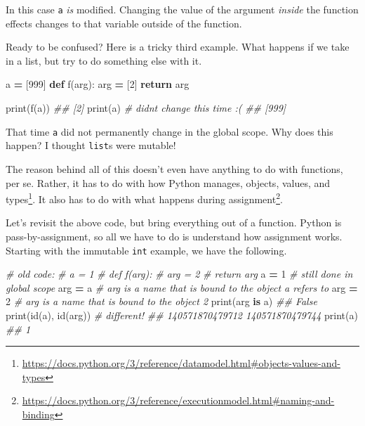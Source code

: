 \documentclass[
  12pt,
  krantz2]{krantz}
\makeatletter
\newenvironment{Shaded}{\begin{snugshade}}{\end{snugshade}}
\newcommand{\BuiltInTok}[1]{#1}
\newcommand{\CommentTok}[1]{\textcolor[rgb]{0.37,0.37,0.37}{\textit{#1}}}
\newcommand{\ControlFlowTok}[1]{\textcolor[rgb]{0.27,0.27,0.27}{\textbf{#1}}}
\newcommand{\DecValTok}[1]{\textcolor[rgb]{0.06,0.06,0.06}{#1}}
\newcommand{\KeywordTok}[1]{\textcolor[rgb]{0.27,0.27,0.27}{\textbf{#1}}}
\newcommand{\NormalTok}[1]{#1}
\newcommand{\OperatorTok}[1]{\textcolor[rgb]{0.43,0.43,0.43}{\textbf{#1}}}
\renewcommand{\href}[2]{#2\footnote{\url{#1}}}
\newenvironment{kframe}{%
\medskip{}
\setlength{\fboxsep}{.8em}
 \def\at@end@of@kframe{}%
 \ifinner\ifhmode%
  \def\at@end@of@kframe{\end{minipage}}%
  \begin{minipage}{\columnwidth}%
 \fi\fi%
 \def\FrameCommand##1{\hskip\@totalleftmargin \hskip-\fboxsep
 \colorbox{shadecolor}{##1}\hskip-\fboxsep
     \hskip-\linewidth \hskip-\@totalleftmargin \hskip\columnwidth}%
 \MakeFramed {\advance\hsize-\width
   \@totalleftmargin\z@ \linewidth\hsize
   \@setminipage}}%
 {\par\unskip\endMakeFramed%
 \at@end@of@kframe}
\renewenvironment{Shaded}{\begin{kframe}}{\end{kframe}}
\makeatother
\begin{document}
In this case \texttt{a} \emph{is} modified. Changing the value of the argument \emph{inside} the function effects changes to that variable outside of the function.

Ready to be confused? Here is a tricky third example. What happens if we take in a list, but try to do something else with it.

\begin{Shaded}
\begin{Highlighting}[]
\NormalTok{a }\OperatorTok{=}\NormalTok{ [}\DecValTok{999}\NormalTok{]}
\KeywordTok{def}\NormalTok{ f(arg):}
\NormalTok{    arg }\OperatorTok{=}\NormalTok{ [}\DecValTok{2}\NormalTok{]}
    \ControlFlowTok{return}\NormalTok{ arg}

\BuiltInTok{print}\NormalTok{(f(a))}
\CommentTok{\#\# [2]}
\BuiltInTok{print}\NormalTok{(a) }\CommentTok{\# didn\textquotesingle{}t change this time :(}
\CommentTok{\#\# [999]}
\end{Highlighting}
\end{Shaded}

That time \texttt{a} did not permanently change in the global scope. Why does this happen? I thought \texttt{list}s were mutable!

The reason behind all of this doesn't even have anything to do with functions, per se. Rather, it has to do with how Python manages, \href{https://docs.python.org/3/reference/datamodel.html\#objects-values-and-types}{objects, values, and types}. It also has to do with what happens during \href{https://docs.python.org/3/reference/executionmodel.html\#naming-and-binding}{assignment}.

Let's revisit the above code, but bring everything out of a function. Python is pass-by-assignment, so all we have to do is understand how assignment works. Starting with the immutable \texttt{int} example, we have the following.

\begin{Shaded}
\begin{Highlighting}[]
\CommentTok{\# old code: }
\CommentTok{\# a = 1}
\CommentTok{\# def f(arg):}
\CommentTok{\#     arg = 2}
\CommentTok{\#     return arg}
\NormalTok{a }\OperatorTok{=} \DecValTok{1}    \CommentTok{\# still done in global scope}
\NormalTok{arg }\OperatorTok{=}\NormalTok{ a  }\CommentTok{\# arg is a name that is bound to the object a refers to}
\NormalTok{arg }\OperatorTok{=} \DecValTok{2}  \CommentTok{\# arg is a name that is bound to the object 2}
\BuiltInTok{print}\NormalTok{(arg }\KeywordTok{is}\NormalTok{ a)}
\CommentTok{\#\# False}
\BuiltInTok{print}\NormalTok{(}\BuiltInTok{id}\NormalTok{(a), }\BuiltInTok{id}\NormalTok{(arg)) }\CommentTok{\# different!\textasciigrave{}}
\CommentTok{\#\# 140571870479712 140571870479744}
\BuiltInTok{print}\NormalTok{(a)}
\CommentTok{\#\# 1}
\end{Highlighting}
\end{Shaded}
\end{document}
